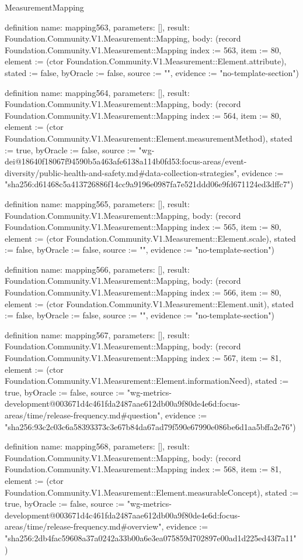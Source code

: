 \begin{lexlean}{MeasurementMapping}
\begin{semanticmodule}
definition{
  name: mapping563,
  parameters: [],
  result: Foundation.Community.V1.Measurement::Mapping,
  body: (record Foundation.Community.V1.Measurement::Mapping {index := 563, item := 80, element := (ctor Foundation.Community.V1.Measurement::Element.attribute), stated := false, byOracle := false, source := "", evidence := "no-template-section"})
}

definition{
  name: mapping564,
  parameters: [],
  result: Foundation.Community.V1.Measurement::Mapping,
  body: (record Foundation.Community.V1.Measurement::Mapping {index := 564, item := 80, element := (ctor Foundation.Community.V1.Measurement::Element.measurementMethod), stated := true, byOracle := false, source := "wg-dei@18640f18067f94590b5a463afe6138a114b0fd53:focus-areas/event-diversity/public-health-and-safety.md#data-collection-strategies", evidence := "sha256:d61468c5a413726886f14cc9a9196e0987fa7e521ddd06e9fd671124ed3dffc7"})
}

definition{
  name: mapping565,
  parameters: [],
  result: Foundation.Community.V1.Measurement::Mapping,
  body: (record Foundation.Community.V1.Measurement::Mapping {index := 565, item := 80, element := (ctor Foundation.Community.V1.Measurement::Element.scale), stated := false, byOracle := false, source := "", evidence := "no-template-section"})
}

definition{
  name: mapping566,
  parameters: [],
  result: Foundation.Community.V1.Measurement::Mapping,
  body: (record Foundation.Community.V1.Measurement::Mapping {index := 566, item := 80, element := (ctor Foundation.Community.V1.Measurement::Element.unit), stated := false, byOracle := false, source := "", evidence := "no-template-section"})
}

definition{
  name: mapping567,
  parameters: [],
  result: Foundation.Community.V1.Measurement::Mapping,
  body: (record Foundation.Community.V1.Measurement::Mapping {index := 567, item := 81, element := (ctor Foundation.Community.V1.Measurement::Element.informationNeed), stated := true, byOracle := false, source := "wg-metrics-development@003671d4c461fda2487aae612db00a9f80de4e6d:focus-areas/time/release-frequency.md#question", evidence := "sha256:93c2c03c6a58393373c3e67b84da67ad79f590e67990e086be6d1aa5bffa2e76"})
}

definition{
  name: mapping568,
  parameters: [],
  result: Foundation.Community.V1.Measurement::Mapping,
  body: (record Foundation.Community.V1.Measurement::Mapping {index := 568, item := 81, element := (ctor Foundation.Community.V1.Measurement::Element.measurableConcept), stated := true, byOracle := false, source := "wg-metrics-development@003671d4c461fda2487aae612db00a9f80de4e6d:focus-areas/time/release-frequency.md#overview", evidence := "sha256:2db4fac59608a37a0242a33b00a6e3ea075859d702897e00ad1d225ed43f7a11"})
}


\end{semanticmodule}
\end{lexlean}
